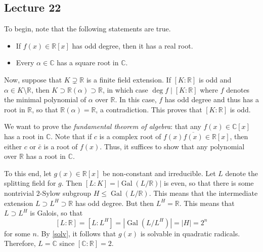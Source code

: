 \documentclass[10pt,letterpaper,cm]{nupset}
\theoremstyle{definition}
\theoremstyle{theorem}
\theoremstyle{remark}
\newcommand{\C}{\mathbb C}
\newcommand{\R}{\mathbb R}
\newcommand{\1}{\mathbf{1}}
\newcommand{\0}{\vec 0}
\DeclareMathOperator{\gal}{Gal}
\begin{document}
\subsection{Lecture 22}

To begin, note that the following statements are true.
\begin{itemize}
\item If $f(x) \in \R[x]$ has odd degree, then it has a real root.
\item Every $\alpha \in \C$ has a square root in $\C$.
\end{itemize}
Now, suppose that $K \supsetneq \R$ is a finite field extension. If $[K : \R]$ is odd and $\alpha \in K \setminus \R$, then $K \supset \R(\alpha) \supset \R$, in which case $\deg{f} \mid [K : \R]$ where $f$ denotes the minimal polynomial of $\alpha$ over $\R$.  In this case, $f$ has odd degree and thus has a root in $\R$, so that $\R(\alpha) = \R$, a contradiction. This proves that $[K : \R]$ is odd.

We want to prove the \textit{fundamental theorem of algebra}: that any $f(x) \in \C[x]$ has a root in $\C$. Note that if $c$ is a complex root of $f(x)\overline{f(x)} \in \R[x]$, then either $c$ or $\bar{c}$ is a root of $f(x)$.  Thus, it suffices to show that any polynomial over $\R$ has a root in $\C$.

To this end, let $g(x) \in \R[x]$ be non-constant and irreducible. Let $L$ denote the splitting field for $g$. Then $[L :K] = \left\lvert{\gal(L/\R)}\right\rvert$ is even, so that there is some nontrivial $2$-Sylow subgroup $H \leq \gal(L/\R)$. This means that the intermediate extension $L \supset L^H \supset \R$ has odd degree. But then $L^H = \R$. This means that $L \supset L^H$ is Galois, so that $$\left[L: \R\right] = \left[L: L^H\right] = \left\lvert{\gal(L/L^H)}\right\rvert = \left\lvert{H}\right\rvert = 2^n$$ for some $n$. By \cref{solv}, it follows that $g(x)$ is solvable in quadratic radicals. Therefore, $L = \C$ since $\left[\C : \R\right] = 2$. 
\end{document}
